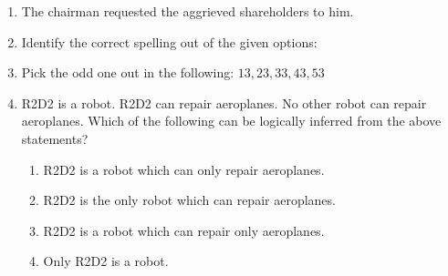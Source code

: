 \documentclass[journal,12pt,onecolumn]{IEEEtran}
\theoremstyle{remark}
\begin{document}
\begin{enumerate}[start=1, label=Q.\arabic*]
    \hfill{}

    \item The chairman requested the aggrieved shareholders to \underline{\hspace{2cm}} him.
    \begin{enumerate}
    \end{enumerate}

    \hfill{}

    \item Identify the correct spelling out of the given options:
    \begin{enumerate}
    \end{enumerate}

    \hfill{}

    \item Pick the odd one out in the following:
    $13, 23, 33, 43, 53$
    \begin{enumerate}
    \end{enumerate}

    \hfill{}

    \item R2D2 is a robot. R2D2 can repair aeroplanes. No other robot can repair aeroplanes.
    Which of the following can be logically inferred from the above statements?
    \begin{enumerate}
        \item R2D2 is a robot which can only repair aeroplanes.
        \item R2D2 is the only robot which can repair aeroplanes.
        \item R2D2 is a robot which can repair only aeroplanes.
        \item Only R2D2 is a robot.
    \end{enumerate}


\end{enumerate}
\end{document}
